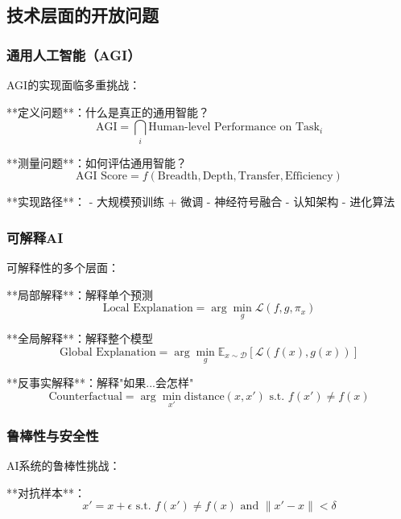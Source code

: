\subsection{技术层面的开放问题}

\subsubsection{通用人工智能（AGI）}

AGI的实现面临多重挑战：

**定义问题**：什么是真正的通用智能？
\begin{equation}
\text{AGI} = \bigcap_{i} \text{Human-level Performance on Task}_i
\end{equation}

**测量问题**：如何评估通用智能？
\begin{equation}
\text{AGI Score} = f(\text{Breadth}, \text{Depth}, \text{Transfer}, \text{Efficiency})
\end{equation}

**实现路径**：
- 大规模预训练 + 微调
- 神经符号融合
- 认知架构
- 进化算法

\subsubsection{可解释AI}

可解释性的多个层面：

**局部解释**：解释单个预测
\begin{equation}
\text{Local Explanation} = \arg\min_g \mathcal{L}(f, g, \pi_x)
\end{equation}

**全局解释**：解释整个模型
\begin{equation}
\text{Global Explanation} = \arg\min_g \mathbb{E}_{x \sim \mathcal{D}}[\mathcal{L}(f(x), g(x))]
\end{equation}

**反事实解释**：解释"如果...会怎样"
\begin{equation}
\text{Counterfactual} = \arg\min_{x'} \text{distance}(x, x') \text{ s.t. } f(x') \neq f(x)
\end{equation}

\subsubsection{鲁棒性与安全性}

AI系统的鲁棒性挑战：

**对抗样本**：
\begin{equation}
x' = x + \epsilon \text{ s.t. } f(x') \neq f(x) \text{ and } \|x' - x\| < \delta
\end{equation}

